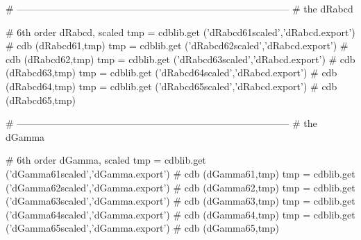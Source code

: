\documentclass[12pt]{cdblatex}
\begin{document}
\begin{cadabra}
   # ------------------------------------------------------------------------------------
   # the dRabcd

   # 6th order dRabcd, scaled
   tmp = cdblib.get ('dRabcd61scaled','dRabcd.export')  # cdb (dRabcd61,tmp)
   tmp = cdblib.get ('dRabcd62scaled','dRabcd.export')  # cdb (dRabcd62,tmp)
   tmp = cdblib.get ('dRabcd63scaled','dRabcd.export')  # cdb (dRabcd63,tmp)
   tmp = cdblib.get ('dRabcd64scaled','dRabcd.export')  # cdb (dRabcd64,tmp)
   tmp = cdblib.get ('dRabcd65scaled','dRabcd.export')  # cdb (dRabcd65,tmp)

   # ------------------------------------------------------------------------------------
   # the dGamma

   # 6th order dGamma, scaled
   tmp = cdblib.get ('dGamma61scaled','dGamma.export')  # cdb (dGamma61,tmp)
   tmp = cdblib.get ('dGamma62scaled','dGamma.export')  # cdb (dGamma62,tmp)
   tmp = cdblib.get ('dGamma63scaled','dGamma.export')  # cdb (dGamma63,tmp)
   tmp = cdblib.get ('dGamma64scaled','dGamma.export')  # cdb (dGamma64,tmp)
   tmp = cdblib.get ('dGamma65scaled','dGamma.export')  # cdb (dGamma65,tmp)

\end{cadabra}
\end{document}
